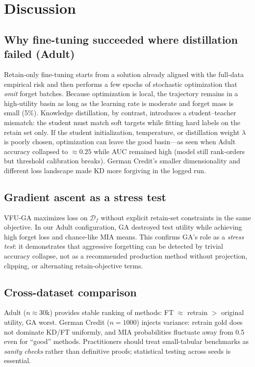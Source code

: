 \documentclass[sigconf,nonacm]{acmart}
\begin{document}
\section{ Discussion}
\label{sec:extended}

\subsection{Why fine-tuning succeeded where distillation failed (Adult)}
Retain-only fine-tuning starts from a solution already aligned with the full-data empirical risk and then performs a few epochs of stochastic optimization that \emph{omit} forget batches. Because optimization is local, the trajectory remains in a high-utility basin as long as the learning rate is moderate and forget mass is small (5\%). Knowledge distillation, by contrast, introduces a student--teacher mismatch: the student must match soft targets while fitting hard labels on the retain set only. If the student initialization, temperature, or distillation weight $\lambda$ is poorly chosen, optimization can leave the good basin---as seen when Adult accuracy collapsed to $\approx 0.25$ while AUC remained high (model still rank-orders but threshold calibration breaks). German Credit's smaller dimensionality and different loss landscape made KD more forgiving in the logged run.

\subsection{Gradient ascent as a stress test}
VFU-GA maximizes loss on $\mathcal{D}_f$ without explicit retain-set constraints in the same objective. In our Adult configuration, GA destroyed test utility while achieving high forget loss and chance-like MIA means. This confirms GA's role as a \emph{stress test}: it demonstrates that aggressive forgetting can be detected by trivial accuracy collapse, not as a recommended production method without projection, clipping, or alternating retain-objective terms.

\subsection{Cross-dataset comparison}
Adult ($n\approx 30$k) provides stable ranking of methods: FT $\approx$ retrain $>$ original utility, GA worst. German Credit ($n{=}1000$) injects variance: retrain gold does not dominate KD/FT uniformly, and MIA probabilities fluctuate away from 0.5 even for ``good'' methods. Practitioners should treat small-tabular benchmarks as \emph{sanity checks} rather than definitive proofs; statistical testing across seeds is essential.
\end{document}
